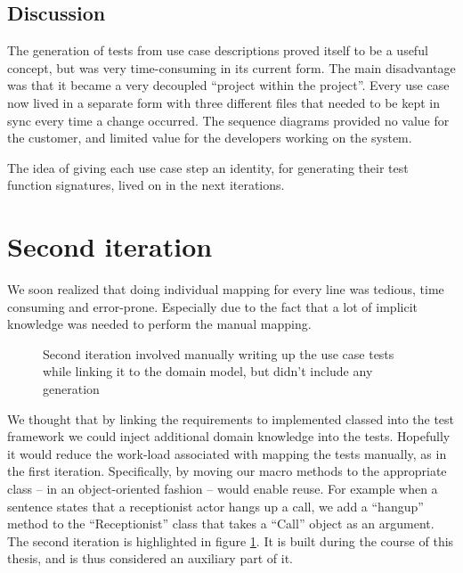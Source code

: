 \subsection{Discussion}
The generation of tests from use case descriptions proved itself to be a useful concept, but was very time-consuming in its current form. The main disadvantage was that it became a very decoupled ``project within the project''. Every use case now lived in a separate form with three different files that needed to be kept in sync every time a change occurred. The sequence diagrams provided no value for the customer, and limited value for the developers working on the system.\smallskip

\noindent The idea of giving each use case step an identity, for generating their test function signatures, lived on in the next iterations.

\section{Second iteration}
We soon realized that doing individual mapping for every line was tedious, time consuming and error-prone. Especially due to the fact that a lot of implicit knowledge was needed to perform the manual mapping.\medskip
\begin{figure}[!htbp]
\centering
{}
\caption{Second iteration involved manually writing up the use case tests while linking it to the domain model, but didn't include any generation}
\label{fig:project_parameter_plot_2nd_iteration}
\end{figure}
\noindent We thought that by linking the requirements to implemented classed into the test framework we could inject additional domain knowledge into the tests. Hopefully it would reduce the work-load associated with mapping the tests manually, as in the first iteration. Specifically, by moving our macro methods to the appropriate class -- in an object-oriented fashion -- would enable reuse. For example when a sentence states that a receptionist actor hangs up a call, we add a ``hangup'' method to the  ``Receptionist'' class that takes a ``Call'' object as an argument. The second iteration is highlighted in figure \ref{fig:project_parameter_plot_2nd_iteration}. It is built during the course of this thesis, and is thus considered an auxiliary part of it.

